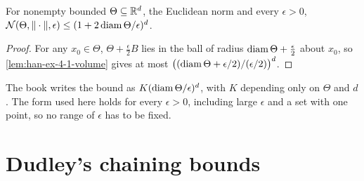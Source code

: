 \begin{lemma}
  \label{lem:han-ex-4-1-poly}
  For nonempty bounded $\Theta\subseteq\mathbb{R}^d$, the Euclidean norm and every $\epsilon>0$, $\mathcal{N}(\Theta,\|\cdot\|,\epsilon)\le(1+2\operatorname{diam}\Theta/\epsilon)^d$.
\end{lemma}
\begin{proof}
  For any $x_0\in\Theta$, $\Theta+\frac\epsilon2B$ lies in the ball of radius $\operatorname{diam}\Theta+\frac\epsilon2$ about $x_0$, so \cref{lem:han-ex-4-1-volume} gives at most $\bigl((\operatorname{diam}\Theta+\epsilon/2)/(\epsilon/2)\bigr)^d$.
\end{proof}
\begin{remark}
  The book writes the bound as $K(\operatorname{diam}\Theta/\epsilon)^d$, with $K$ depending only on $\Theta$ and $d$. The form used here holds for every $\epsilon>0$, including large $\epsilon$ and a set with one point, so no range of $\epsilon$ has to be fixed.
\end{remark}

\section{Dudley's chaining bounds}

